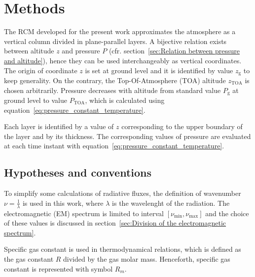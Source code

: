 \documentclass[a4paper,10pt,twocolumn,\classoptions]{article}
\newcommand{\zTOA}{z_\text{TOA}}
\newcommand{\PTOA}{P_\text{TOA}}
\begin{document}
\section{Methods}
\label{sec:Methods}
The RCM developed for the present work approximates the atmosphere as a vertical column divided in plane-parallel layers. 
A bijective relation exists between altitude $z$ and pressure $P$ (cfr. section~\ref{sec:Relation between pressure and altitude}), hence they can be used interchangeably as vertical coordinates. The origin of coordinate $z$ is set at ground level and it is identified by value $z_\text{g}$ to keep generality. On the contrary, the Top-Of-Atmosphere (TOA) altitude $\zTOA$ is chosen arbitrarily. Pressure decreases with altitude from standard value $P_\text{g}$ at ground level to value $\PTOA$, which is calculated using equation~\eqref{eq:pressure_constant_temperature}. %

Each layer is identified by a value of $z$ corresponding to the upper boundary of the layer and by its thickness. The corresponding values of pressure are evaluated at each time instant with equation~\eqref{eq:pressure_constant_temperature}.



\subsection{Hypotheses and conventions}
\label{sec:Hypotheses and conventions}
To simplify some calculations of radiative fluxes,
the definition of wavenumber $\nu = \frac{1}{\lambda}$ is used in this work, where $\lambda$ is the wavelenght of the radiation. The electromagnetic (EM) spectrum is limited to interval $[\nu_\text{min}, \nu_\text{max}]$ and the choice of these values is discussed in section~\ref{sec:Division of the electromagnetic spectrum}.

Specific gas constant is used in thermodynamical relations, which is defined as the gas constant $R$ divided by the gas molar mass. Henceforth, specific gas constant is represented with symbol $R_m$.
\end{document}
